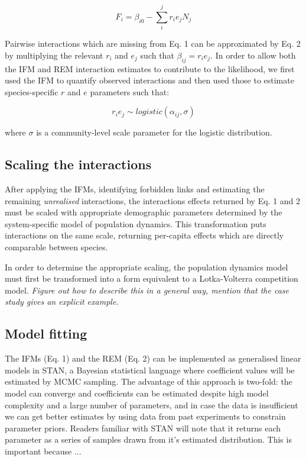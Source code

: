 \documentclass[a4,12pt]{article}
\begin{document}
        \begin{equation}
        F_{i} = \beta_{i0} - \sum_{i}^{j} r_{i} e_{j} N_{j}
        \label{rem1}
        \end{equation}
        
        Pairwise interactions which are missing from Eq. 1 can be approximated by Eq. 2 by multiplying the relevant $r_{i}$ and $e_{j}$ such that $\beta_{ij} = r_{i} e_{j}$. In order to allow both the IFM and REM interaction estimates to contribute to the likelihood, we first used the IFM to quantify observed interactions and then used those to estimate species-specific $r$ and $e$ parameters such that: 
    
        \begin{equation}
        r_i e_j \sim logistic \left ( \alpha_{ij}, \sigma \right )
        \label{unrealised}
        \end{equation}
    
        where $\sigma$ is a community-level scale parameter for the logistic distribution. 
        
    \subsection{Scaling the interactions}
        
        After applying the IFMs, identifying forbidden links and estimating the remaining \textit{unrealised} interactions, the interactions effects returned by Eq. 1 and 2 must be scaled with appropriate demographic parameters determined by the system-specific model of population dynamics. This transformation puts interactions on the same scale, returning per-capita effects which are directly comparable between species. 
        
        In order to determine the appropriate scaling, the population dynamics model must first be transformed into a form equivalent to a Lotka-Volterra competition model. \textit{Figure out how to describe this in a general way, mention that the case study gives an explicit example.}
        
    \subsection{Model fitting}
        
        The IFMs (Eq. 1) and the REM (Eq. 2) can be implemented as generalised linear models in STAN, a Bayesian statistical language where coefficient values will be estimated by MCMC sampling. The advantage of this approach is two-fold: the model can converge and coefficients can be estimated despite high model complexity and a large number of parameters, and in case the data is insufficient we can get better estimates by using data from past experiments to constrain parameter priors. Readers familiar with STAN will note that it returns each parameter as a series of samples drawn from it's estimated distribution. This is important because ...
\end{document}
